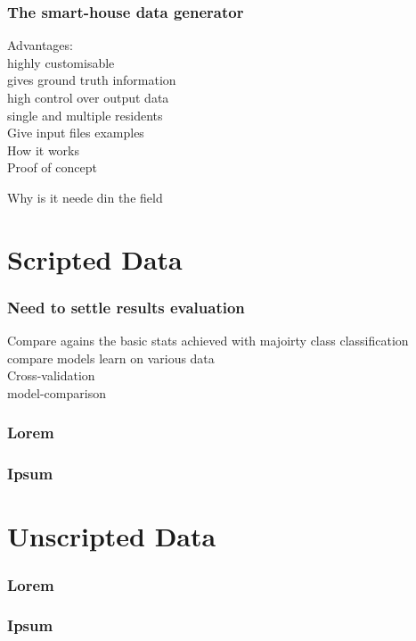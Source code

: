 \documentclass[10pt]{beamer}
\begin{document}
\begin{frame}[plain]
  \frametitle{The smart-house data generator}

Advantages:\\
highly customisable\\
gives ground truth information\\
high control over output data\\
single and multiple residents\\

Give input files examples\\
How it works\\

Proof of concept

Why is it neede din the field

\end{frame}


\section{Scripted Data}
\begin{frame}[plain]
  \frametitle{Need to settle results evaluation}
Compare agains the basic stats achieved with majoirty class classification\\
compare models learn on various data\\
Cross-validation\\
model-comparison\\
\end{frame}

\begin{frame}
  \frametitle{Lorem}
\end{frame} 
\begin{frame}[plain]
  \frametitle{Ipsum}
\end{frame} 

\section{Unscripted Data}
\begin{frame}
  \frametitle{Lorem}
\end{frame} 
\begin{frame}[plain]
  \frametitle{Ipsum}
\end{frame} 
\end{document}
